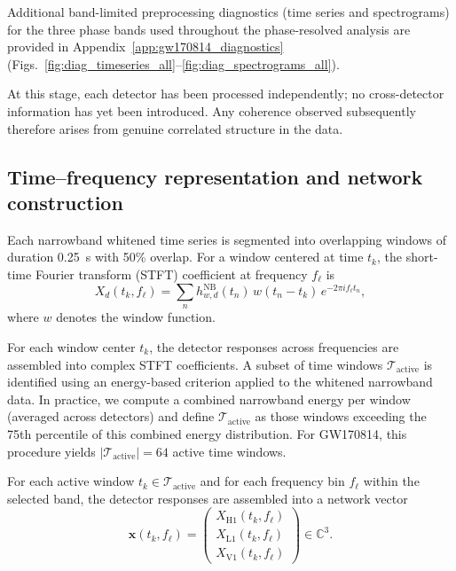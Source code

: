 \documentclass[11pt,a4paper]{article}
\begin{document}
Additional band-limited preprocessing diagnostics (time series and spectrograms) for the three phase bands used throughout the phase-resolved analysis are provided in Appendix~\ref{app:gw170814_diagnostics} (Figs.~\ref{fig:diag_timeseries_all}--\ref{fig:diag_spectrograms_all}).

At this stage, each detector has been processed independently; no cross-detector information has yet been introduced.
Any coherence observed subsequently therefore arises from genuine correlated structure in the data.

\subsection{Time--frequency representation and network construction}

Each narrowband whitened time series is segmented into overlapping windows of duration 0.25~s with 50\% overlap.
For a window centered at time $t_k$, the short-time Fourier transform (STFT) coefficient at frequency $f_\ell$ is
\begin{equation}
X_d(t_k,f_\ell)
= \sum_{n}
h^{\mathrm{NB}}_{w,d}(t_n)\,
w(t_n - t_k)\,
e^{-2\pi i f_\ell t_n},
\end{equation}
where $w$ denotes the window function.

For each window center $t_k$, the detector responses across frequencies are assembled into complex STFT coefficients.
A subset of time windows $\mathcal{T}_{\mathrm{active}}$ is identified using an energy-based criterion applied to the whitened narrowband data.
In practice, we compute a combined narrowband energy per window (averaged across detectors) and define $\mathcal{T}_{\mathrm{active}}$ as those windows exceeding the 75th percentile of this combined energy distribution.
For GW170814, this procedure yields $|\mathcal{T}_{\mathrm{active}}| = 64$ active time windows.

For each active window $t_k \in \mathcal{T}_{\mathrm{active}}$ and for each frequency bin $f_\ell$ within the selected band,
the detector responses are assembled into a network vector
\begin{equation}
\mathbf{x}(t_k,f_\ell) =
\begin{pmatrix}
X_{\mathrm{H1}}(t_k,f_\ell) \\
X_{\mathrm{L1}}(t_k,f_\ell) \\
X_{\mathrm{V1}}(t_k,f_\ell)
\end{pmatrix}
\in \mathbb{C}^3.
\end{equation}
\end{document}
